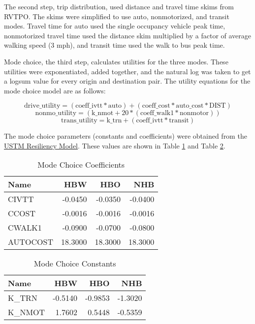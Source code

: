 \documentclass[fancy, masters,twoside]{byuthesis}
\begin{document}
The second step, trip distribution, used distance and travel time skims from RVTPO. The skims were simplified to use auto, nonmotorized, and transit modes. Travel time for auto used the single occupancy vehicle peak time, nonmotorized travel time used the distance skim multiplied by a factor of average walking speed (3 mph), and transit time used the walk to bus peak time.

Mode choice, the third step, calculates utilities for the three modes. These utilities were exponentiated, added together, and the natural log was taken to get a logsum value for every origin and destination pair. The utility equations for the mode choice model are as follows:

\begin{equation}
\mathrm{drive\_utility} = (\mathrm{coeff\_ivtt}*\mathrm{auto})+(\mathrm{coeff\_cost}*\mathrm{auto\_cost}*\mathrm{DIST})
\label{eq:driveutil}
\end{equation} \begin{equation}
\mathrm{nonmo\_utility} = (\mathrm{k\_nmot}+ 20 * (\mathrm{coeff\_walk1}*\mathrm{nonmotor}))
\label{eq:nonmoutil}
\end{equation} \begin{equation}
\mathrm{trans\_utility} = \mathrm{k\_trn} + (\mathrm{coeff\_ivtt}*\mathrm{transit})
\label{eq:transutil}
\end{equation}

The mode choice parameters (constants and coefficients) were obtained from the \href{https://github.com/byu-transpolab/ustm_resiliency}{USTM Resiliency Model}. These values are shown in Table \ref{tab:MCcoeff} and Table \ref{tab:MCconst}.

\begin{table}

\caption{\label{tab:MCcoeff}Mode Choice Coefficients}
\centering
\begin{tabular}[t]{lrrr}
\toprule
Name & HBW & HBO & NHB\\
\midrule
CIVTT & -0.0450 & -0.0350 & -0.0400\\
CCOST & -0.0016 & -0.0016 & -0.0016\\
CWALK1 & -0.0900 & -0.0700 & -0.0800\\
AUTOCOST & 18.3000 & 18.3000 & 18.3000\\
\bottomrule
\end{tabular}
\end{table}

\begin{table}

\caption{\label{tab:MCconst}Mode Choice Constants}
\centering
\begin{tabular}[t]{lrrr}
\toprule
Name & HBW & HBO & NHB\\
\midrule
K\_TRN & -0.5140 & -0.9853 & -1.3020\\
K\_NMOT & 1.7602 & 0.5448 & -0.5359\\
\bottomrule
\end{tabular}
\end{table}
\end{document}
